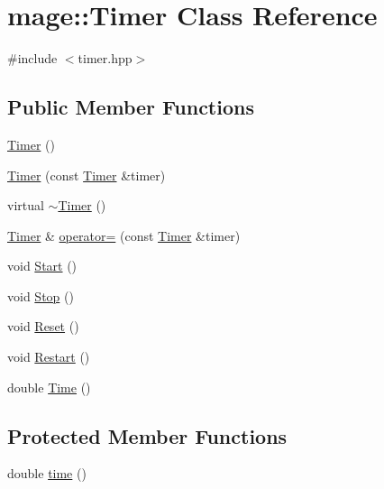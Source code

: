 \hypertarget{classmage_1_1_timer}{}\section{mage\+:\+:Timer Class Reference}
\label{classmage_1_1_timer}


{\ttfamily \#include $<$timer.\+hpp$>$}

\subsection*{Public Member Functions}
\begin{DoxyCompactItemize}
\item 
\hyperlink{classmage_1_1_timer_a5e1c0a3bb4491b3a43ce05874ad24055}{Timer} ()
\item 
\hyperlink{classmage_1_1_timer_a70b7b49108aa67fc751594ae0a310bfe}{Timer} (const \hyperlink{classmage_1_1_timer}{Timer} \&timer)
\item 
virtual \hyperlink{classmage_1_1_timer_aa91cebe8c59c189fde93932fde10265c}{$\sim$\+Timer} ()
\item 
\hyperlink{classmage_1_1_timer}{Timer} \& \hyperlink{classmage_1_1_timer_aaeff75810b47c1d9a01d3821e656eac9}{operator=} (const \hyperlink{classmage_1_1_timer}{Timer} \&timer)
\item 
void \hyperlink{classmage_1_1_timer_a5855c9df8ad1a2b6774942e566833647}{Start} ()
\item 
void \hyperlink{classmage_1_1_timer_abf234f1e2ee9e760f316bd49500d5a3a}{Stop} ()
\item 
void \hyperlink{classmage_1_1_timer_a0675ff7bc0a8e7343b5a35f865cc9c1a}{Reset} ()
\item 
void \hyperlink{classmage_1_1_timer_a4e1ba19d02c290a18981db1766f006c3}{Restart} ()
\item 
double \hyperlink{classmage_1_1_timer_a5e4655ac296cc8971b54e5a76082f00f}{Time} ()
\end{DoxyCompactItemize}
\subsection*{Protected Member Functions}
\begin{DoxyCompactItemize}
\item 
double \hyperlink{classmage_1_1_timer_a782882e9dbe9a2843b5203ba13309b23}{time} ()
\end{DoxyCompactItemize}
